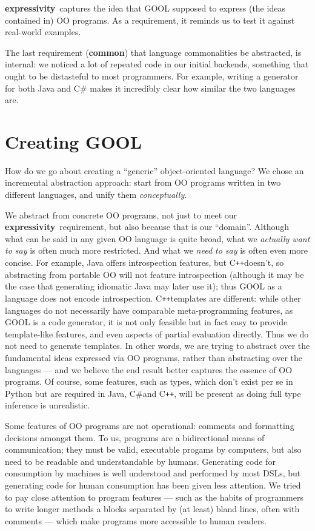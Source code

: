 \documentclass[sigplan,review,anonymous,prologue,dvipsnames]{acmart}
\newcommand{\Csharp}{C\#}
\newcommand{\Cplusplus}{C\texttt{++}}
\newcommand{\abbrev}[1]{\textbf{#1}}
\newcommand{\common}{\abbrev{common}}
\newcommand{\expressivity}{\abbrev{expressivity}}
\begin{document}
\expressivity~captures the idea that GOOL supposed to express
(the ideas contained in) OO programs.  As a requirement, it
reminds us to test it against real-world examples.

The last requirement (\common) that language commonalities be abstracted, is
internal: we noticed a lot of repeated code in our initial
backends, something that ought to be distasteful to most programmers. For
example, writing a generator for both Java and \Csharp{} makes it incredibly
clear how similar the two languages are.

\section{Creating GOOL} \label{sec:creating}

How do we go about creating a ``generic'' object-oriented language?
We chose an incremental abstraction approach: start from OO programs written in 
two different languages, and unify them \emph{conceptually}.

We abstract from concrete OO programs, not just to meet our
\expressivity~requirement, but also because that is our ``domain''.  Although
what can be said in any given OO language is quite broad, what we
\emph{actually want to say} is often much more restricted. And what we
\emph{need to say} is often even more concise.
For example, Java offers introspection features, but \Cplusplus doesn't, so
abstracting from portable OO will not feature introspection (although it
may be the case that generating idiomatic Java may later use it);
thus GOOL as a language does not encode introspection.  \Cplusplus templates
are different: while other languages do not necessarily have comparable
meta-programming features, as GOOL is a code generator, it is not only
feasible but in fact easy to provide template-like features, and even aspects of
partial evaluation directly. Thus we do not need to generate templates.
In other words, we are trying to abstract over the fundamental ideas
expressed via OO programs, rather than abstracting over the languages ---
and we believe the end result better captures the essence of OO programs.
Of course, some features, such as types, which don't exist per se in 
Python but are required in Java, \Csharp and \Cplusplus, will be present
as doing full type inference is unrealistic.

Some features of OO programs are not operational: comments and formatting
decisions amongst them.  To us, programs are a bidirectional means of
communication; they must be valid, executable progams by computers, but
also need to be readable and understandable by humans.
Generating code for consumption by machines is well understood and performed by 
most DSLs, but generating code for human consumption has been given less 
attention. We tried to pay close attention to program features --- such
as the habits of programmers to write longer methods a blocks separated
by (at least) bland lines, often with comments --- which make programs
more accessible to human readers.
\end{document}
